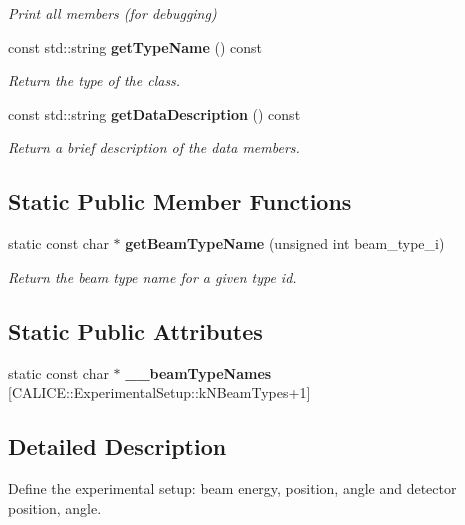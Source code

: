 \begin{DoxyCompactItemize}
\begin{DoxyCompactList}\small\item\em Print all members (for debugging) \end{DoxyCompactList}\item 
const std\-::string {\bf get\-Type\-Name} () const \label{classCALICE_1_1ExperimentalSetup_ae1b3cfdebacc3300684be0ada84173dd}

\begin{DoxyCompactList}\small\item\em Return the type of the class. \end{DoxyCompactList}\item 
const std\-::string {\bf get\-Data\-Description} () const \label{classCALICE_1_1ExperimentalSetup_a5f0b3c312b3b1d53eac95192e39b5211}

\begin{DoxyCompactList}\small\item\em Return a brief description of the data members. \end{DoxyCompactList}\end{DoxyCompactItemize}
\subsection*{Static Public Member Functions}
\begin{DoxyCompactItemize}
\item 
static const char $\ast$ {\bf get\-Beam\-Type\-Name} (unsigned int beam\-\_\-type\-\_\-i)\label{classCALICE_1_1ExperimentalSetup_a2fe50b694e5828226cf432403bf4a9a2}

\begin{DoxyCompactList}\small\item\em Return the beam type name for a given type id. \end{DoxyCompactList}\end{DoxyCompactItemize}
\subsection*{Static Public Attributes}
\begin{DoxyCompactItemize}
\item 
static const char $\ast$ {\bfseries \-\_\-\-\_\-beam\-Type\-Names} [C\-A\-L\-I\-C\-E\-::\-Experimental\-Setup\-::k\-N\-Beam\-Types+1]
\end{DoxyCompactItemize}


\subsection{Detailed Description}
Define the experimental setup\-: beam energy, position, angle and detector position, angle. 

